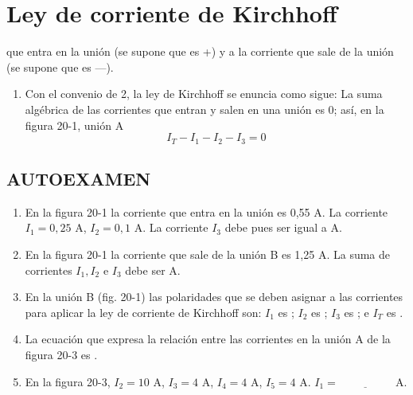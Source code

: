 \documentclass[12pt, a4paper]{article}
\begin{document}
\section*{Ley de corriente de Kirchhoff}

\noindent que entra en la unión (se supone que es +) y a la corriente que sale de la unión (se supone que es —).

\begin{enumerate}[label=\arabic*., start=3]
    \item Con el convenio de 2, la ley de Kirchhoff se enuncia como sigue: La suma algébrica de las corrientes que entran y salen en una unión es 0; así, en la figura 20-1, unión A
    \[
        I_T - I_1 - I_2 - I_3 = 0
    \]
\end{enumerate}

\subsection*{AUTOEXAMEN}
\begin{enumerate}[label=\arabic*.]
    \item En la figura 20-1 la corriente que entra en la unión es 0,55 A. La corriente $I_1 = 0,25$ A, $I_2 = 0,1$ A. La corriente $I_3$ debe pues ser igual a \underline{\hspace{2cm}} A.
    \item En la figura 20-1 la corriente que sale de la unión B es 1,25 A. La suma de corrientes $I_1, I_2$ e $I_3$ debe ser \underline{\hspace{2cm}} A.
    \item En la unión B (fig. 20-1) las polaridades que se deben asignar a las corrientes para aplicar la ley de corriente de Kirchhoff son: $I_1$ es \underline{\hspace{1cm}}; $I_2$ es \underline{\hspace{1cm}}; $I_3$ es \underline{\hspace{1cm}}; e $I_T$ es \underline{\hspace{1cm}}.
    \item La ecuación que expresa la relación entre las corrientes en la unión A de la figura 20-3 es \underline{\hspace{4cm}}.
    \item En la figura 20-3, $I_2 = 10$ A, $I_3 = 4$ A, $I_4 = 4$ A, $I_5 = 4$ A. $I_1 = \underline{\hspace{2cm}}$ A.
\end{enumerate}

\vspace{1cm}
\end{document}
